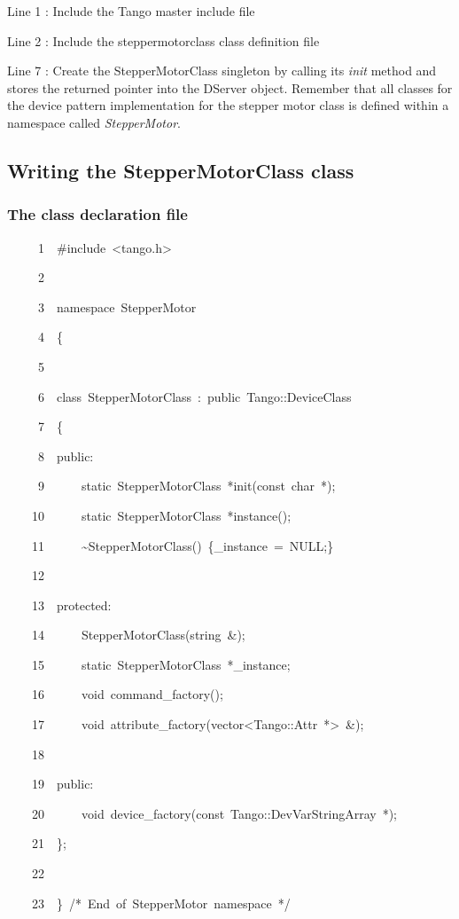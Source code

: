 Line 1 : Include the Tango master include file

Line 2 : Include the steppermotorclass class definition file

Line 7 : Create the StepperMotorClass singleton by calling its \emph{init}
method and stores the returned pointer into the DServer object. Remember
that all classes for the device pattern implementation for the stepper
motor class is defined within a namespace called
\emph{StepperMotor}.


\subsection{Writing the StepperMotorClass class\label{Command fact}}


\subsubsection{The class declaration file}


\begin{lyxcode}
~~~~~1~~\#include~<tango.h>

~~~~~2~~

~~~~~3~~namespace~StepperMotor

~~~~~4~~\{

~~~~~5~~

~~~~~6~~class~StepperMotorClass~:~public~Tango::DeviceClass

~~~~~7~~\{

~~~~~8~~public:

~~~~~9~~~~~~static~StepperMotorClass~{*}init(const~char~{*});

~~~~10~~~~~~static~StepperMotorClass~{*}instance();

~~~~11~~~~~~\textasciitilde{}StepperMotorClass()~\{\_instance~=~NULL;\}

~~~~12~~~~~~~~~~

~~~~13~~protected:

~~~~14~~~~~~StepperMotorClass(string~\&);

~~~~15~~~~~~static~StepperMotorClass~{*}\_instance;

~~~~16~~~~~~void~command\_factory();

~~~~17~~~~~~void~attribute\_factory(vector<Tango::Attr~{*}>~\&);

~~~~18~~~~~~~~~~

~~~~19~~public:

~~~~20~~~~~~void~device\_factory(const~Tango::DevVarStringArray~{*});

~~~~21~~\};

~~~~22~~

~~~~23~~\}~/{*}~End~of~StepperMotor~namespace~{*}/
\end{lyxcode}


